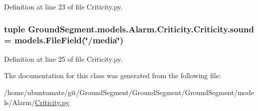 Definition at line 23 of file Criticity.\+py.

\hypertarget{class_ground_segment_1_1models_1_1_alarm_1_1_criticity_1_1_criticity_a1cd251b97d58bdfcb133ba4cf85675f7}{}
\subsubsection[{sound}]{\setlength{\rightskip}{0pt plus 5cm}tuple Ground\+Segment.\+models.\+Alarm.\+Criticity.\+Criticity.\+sound = models.\+File\+Field(\char`\"{}/media\char`\"{})\hspace{0.3cm}{\ttfamily [static]}}\label{class_ground_segment_1_1models_1_1_alarm_1_1_criticity_1_1_criticity_a1cd251b97d58bdfcb133ba4cf85675f7}


Definition at line 25 of file Criticity.\+py.



The documentation for this class was generated from the following file\+:\begin{DoxyCompactItemize}
\item 
/home/ubuntumate/git/\+Ground\+Segment/\+Ground\+Segment/\+Ground\+Segment/models/\+Alarm/\hyperlink{_criticity_8py}{Criticity.\+py}\end{DoxyCompactItemize}
